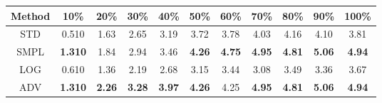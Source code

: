 \documentclass{standalone}
\begin{document}
\begin{tabular}{c|cccccccccc}
      \toprule
      Method & 10\% & 20\% & 30\% & 40\% & 50\% & 60\% & 70\% & 80\% & 90\% & 100\% \\
      \midrule
STD & 0.510 & 1.63 & 2.65 & 3.19 & 3.72 & 3.78 & 4.03 & 4.16 & 4.10 & 3.81\\
SMPL & \textbf{1.310} & 1.84 & 2.94 & 3.46 & \textbf{4.26} & \textbf{4.75} & \textbf{4.95} & \textbf{4.81} & \textbf{5.06} & \textbf{4.94}\\
LOG & 0.610 & 1.36 & 2.19 & 2.68 & 3.15 & 3.44 & 3.08 & 3.49 & 3.36 & 3.67\\
ADV & \textbf{1.310} & \textbf{2.26} & \textbf{3.28} & \textbf{3.97} & \textbf{4.26} & 4.25 & \textbf{4.95} & \textbf{4.81} & \textbf{5.06} & \textbf{4.94}\\
  \bottomrule
\end{tabular}
\end{document}
